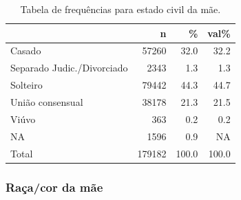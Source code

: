 \documentclass[
]{article}
\begin{document}
\begin{table}[H]

\caption{\label{tab:unnamed-chunk-17}Tabela de frequências para estado civil da mãe.}
\centering
\begin{tabular}[t]{l|r|r|r}
\hline
  & n & \% & val\%\\
\hline
Casado & 57260 & 32.0 & 32.2\\
\hline
Separado Judic./Divorciado & 2343 & 1.3 & 1.3\\
\hline
Solteiro & 79442 & 44.3 & 44.7\\
\hline
União consensual & 38178 & 21.3 & 21.5\\
\hline
Viúvo & 363 & 0.2 & 0.2\\
\hline
NA & 1596 & 0.9 & NA\\
\hline
Total & 179182 & 100.0 & 100.0\\
\hline
\end{tabular}
\end{table}

\hypertarget{rauxe7acor-da-muxe3e}{%
\subsubsection{Raça/cor da mãe}\label{rauxe7acor-da-muxe3e}}
\end{document}
